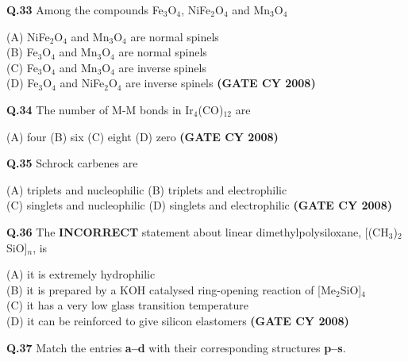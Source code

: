 \documentclass[12pt]{article}
\begin{document}
\begin{enumerate}
\vspace{0.5cm}

\textbf{Q.33} Among the compounds Fe$_3$O$_4$, NiFe$_2$O$_4$ and Mn$_3$O$_4$

(A) NiFe$_2$O$_4$ and Mn$_3$O$_4$ are normal spinels\\
(B) Fe$_3$O$_4$ and Mn$_3$O$_4$ are normal spinels\\
(C) Fe$_3$O$_4$ and Mn$_3$O$_4$ are inverse spinels\\
(D) Fe$_3$O$_4$ and NiFe$_2$O$_4$ are inverse spinels   \textbf{(GATE CY 2008)}


\vspace{0.5cm}

\textbf{Q.34} The number of M-M bonds in Ir$_4$(CO)$_{12}$ are

(A) four \hspace{1cm}
(B) six \hspace{1cm}
(C) eight \hspace{1cm}
(D) zero   \textbf{(GATE CY 2008)}


\vspace{0.5cm}

\textbf{Q.35} Schrock carbenes are

(A) triplets and nucleophilic \hspace{1cm}
(B) triplets and electrophilic\\
(C) singlets and nucleophilic \hspace{1cm}
(D) singlets and electrophilic   \textbf{(GATE CY 2008)}


\vspace{0.5cm}

\textbf{Q.36} The \textbf{INCORRECT} statement about linear dimethylpolysiloxane, [(CH$_3$)$_2$SiO]$_n$, is

(A) it is extremely hydrophilic\\
(B) it is prepared by a KOH catalysed ring-opening reaction of [Me$_2$SiO]$_4$\\
(C) it has a very low glass transition temperature\\
(D) it can be reinforced to give silicon elastomers   \textbf{(GATE CY 2008)}


\vspace{0.5cm}

\textbf{Q.37} Match the entries \textbf{a–d} with their corresponding structures \textbf{p–s}.\\[1em]


\end{enumerate}
\end{document}
